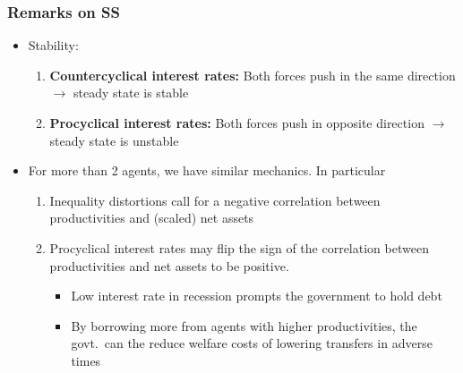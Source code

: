 \documentclass{beamer}
\begin{document}
\begin{frame}
 \frametitle{Remarks on SS}
 \begin{itemize}
 \item Stability:
 \begin{enumerate}
  \item \textbf{Countercyclical interest rates:} Both forces push in the same direction $\rightarrow$ steady state is stable
  \item \textbf{Procyclical interest rates:} Both forces push in opposite direction $\rightarrow$ steady state is unstable
 \end{enumerate}
 \item For more than 2 agents, we have similar mechanics. In particular
  \begin{enumerate}
   \item Inequality distortions call for a negative correlation between productivities and (scaled) net assets
   \item Procyclical interest rates may flip the sign of the correlation between productivities and net assets to be positive.

   \begin{itemize}
   \item Low interest rate in recession prompts the government to hold debt
   \item By borrowing more from agents with higher productivities, the govt.\ can the reduce welfare costs of lowering transfers in adverse times
   \end{itemize}

  \end{enumerate}
\end{itemize}


\end{frame}
\end{document}
